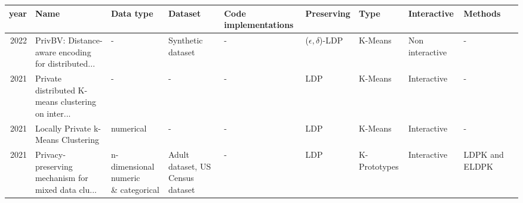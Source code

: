 \begin{landscape}
  \begin{table}[ht]
    \centering
    \begin{adjustbox}{width=1.6\textwidth}
      \begin{tabular}{rlllllllll}
        \toprule
        year                                            & Name                                               & Data type                         & Dataset                                            & Code implementations                               & Preserving               & Type                & Interactive     & Methods                          \\
        \midrule
        2022 \citep{sun_privbv_2022}                    & PrivBV: Distance-aware encoding for distributed... & -                                 & Synthetic dataset                                  & -                                                  & ($\epsilon, \delta$)-LDP & K-Means             & Non interactive & -                                \\
        2021 \citep{9679364}                            & Private distributed K-means clustering on inter... & -                                 & -                                                  & -                                                  & LDP                      & K-Means             & Interactive     & -                                \\
        2021 \citep{stemmer_locally_2021}               & Locally Private k-Means Clustering                 & numerical                         & -                                                  & -                                                  & LDP                      & K-Means             & Interactive     & -                                \\
        2021 \citep{yuan_privacypreserving_2021}        & Privacy‐preserving mechanism for mixed data clu... & \shortstack{n-dimensional numeric                                                                                                                                                                                                                 \\ \& categorical} & Adult dataset, US Census dataset                   & -                                                  & LDP                      & K-Prototypes        & Interactive     & LDPK and ELDPK                            \\

\end{tabular}
\end{adjustbox}
\end{table}
\end{landscape}
